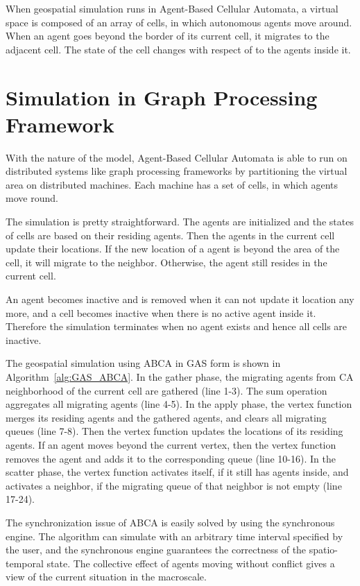 When geospatial simulation runs in Agent-Based Cellular Automata, a virtual space is composed of an array of cells, in which autonomous agents move around. When an agent goes beyond the border of its current cell, it migrates to the adjacent cell. The state of the cell changes with respect of to the agents inside it. 

\section{Simulation in Graph Processing Framework}

With the nature of the model, Agent-Based Cellular Automata is able to run on distributed systems like graph processing frameworks by partitioning the virtual area on distributed machines. Each machine has a set of cells, in which agents move round.

The simulation is pretty straightforward. The agents are initialized and the states of cells are based on their residing agents. Then the agents in the current cell update their locations. If the new location of a agent is beyond the area of the cell, it will migrate to the neighbor. Otherwise, the agent still resides in the current cell.

An agent becomes inactive and is removed when it can not update it location any more, and a cell becomes inactive when there is no active agent inside it. Therefore the simulation terminates when no agent exists and hence all cells are inactive.

The geospatial simulation using ABCA in GAS form is shown in Algorithm~\vref{alg:GAS_ABCA}. In the gather phase, the migrating agents from CA neighborhood of the current cell are gathered (line 1-3). The sum operation aggregates all migrating agents (line 4-5). In the apply phase, the vertex function merges its residing agents and the gathered agents, and clears all migrating queues (line 7-8). Then the vertex function updates the locations of its residing agents. If an agent moves beyond the current vertex, then the vertex function removes the agent and adds it to the corresponding queue (line 10-16). In the scatter phase, the vertex function activates itself, if it still has agents inside, and activates a neighbor, if the migrating queue of that neighbor is not empty (line 17-24).

The synchronization issue of ABCA is easily solved by using the synchronous engine. The algorithm can simulate with an arbitrary time interval specified by the user, and the synchronous engine guarantees the correctness of the spatio-temporal state. The collective effect of agents moving without conflict gives a view of the current situation in the macroscale.

